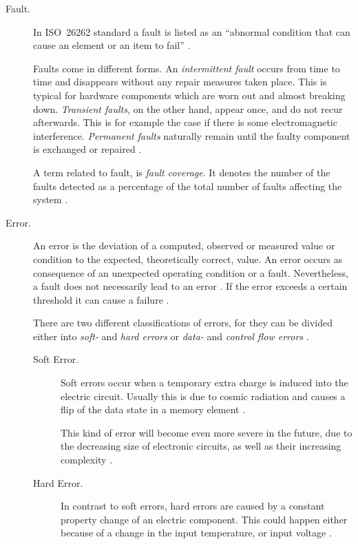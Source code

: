 \begin{description}
\item [Fault.]
In \mbox{ISO 26262} standard a fault is listed as an ``abnormal condition that can cause an element or an item to fail'' \cite{iso26262:1} \cite{autosar_glossary}. 

Faults come in different forms. An \emph{intermittent fault} occurs from time to time and disappears without any repair measures taken place. This is typical for hardware components which are worn out and almost breaking down. \emph{Transient faults}, on the other hand, appear once, and do not recur afterwards. This is for example the case if there is some electromagnetic interference. \emph{Permanent faults} naturally remain until the faulty component is exchanged or repaired \cite{iso26262:1}.

A term related to fault, is \emph{fault coverage}. It denotes the number of the faults detected as a percentage of the total number of faults affecting the system \cite{elattar2007}.

\item [Error.]
An error is the deviation of a computed, observed or measured value or condition to the expected, theoretically correct, value. An error occurs as consequence of an unexpected operating condition or a fault. Nevertheless, a fault does not necessarily lead to an error \cite{iso26262:1} \cite{nelson} \cite{autosar_glossary}. If the error exceeds a certain threshold it can cause a failure \cite{autosar_glossary}.

There are two different classifications of errors, for they can be divided either into \emph{soft-} and \emph{hard errors} or \emph{data-} and \emph{control flow errors} \cite{israr2014} \cite{elattar2007}.

\begin{description}
\item [Soft Error.]
Soft errors occur when a temporary extra charge is induced into the electric circuit. Usually this is due to cosmic radiation and causes a flip of the data state in a memory element \cite{israr2014} \cite{elattar2007}.

This kind of error will become even more severe in the future, due to the decreasing size of electronic circuits, as well as their increasing complexity \cite{elattar2007}.

\item [Hard Error.]
In contrast to soft errors, hard errors are caused by a constant property change of an electric component. This could happen either because of a change in the input temperature, or input voltage \cite{israr2014}.
\end{description}


\end{description}
